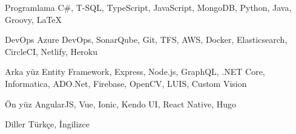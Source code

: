 
\begin{cvskills}

  \cvskill
    {Programlama} %
    {C\#, T-SQL, TypeScript, JavaScript, MongoDB, Python, Java, Groovy, \LaTeX} %

  \cvskill
    {DevOps} %
    {Azure DevOps, SonarQube, Git, TFS, AWS, Docker, Elasticsearch, CircleCI, Netlify, Heroku} %

  \cvskill
    {Arka yüz} %
    {Entity Framework, Express, Node.js, GraphQL, .NET Core, Informatica, ADO.Net, Firebase, OpenCV, LUIS, Custom Vision} %

  \cvskill
    {Ön yüz} %
    {AngularJS, Vue, Ionic, Kendo UI, React Native, Hugo} %

  \cvskill
    {Diller} %
    {Türkçe, İngilizce} %

\end{cvskills}
